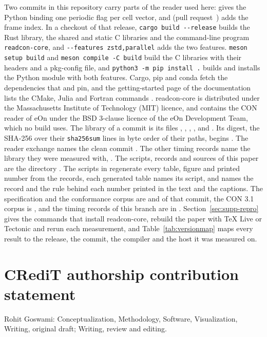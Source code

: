 \documentclass[preprint,12pt]{elsarticle}
\begin{document}
Two commits in this repository carry parts of the reader used here:
\texttt{\readconpbccommit} gives the Python binding one periodic flag
per cell vector, and \texttt{\readconrcidxcommit} (pull
request~\readconrcidxpr) adds the frame index.
In a checkout of that release, \texttt{cargo build -{}-release} builds
the Rust library, the shared and static C libraries and the command-line
program \texttt{readcon-core}, and \texttt{-{}-features zstd,parallel}
adds the two features.
\texttt{meson setup build} and \texttt{meson compile -C build} build the
C libraries with their headers and a pkg-config file, and
\texttt{python3 -m pip install .} builds and installs the Python module
with both features.
Cargo, pip and conda fetch the dependencies that  and
 pin, and the getting-started page of the
documentation lists the CMake, Julia and Fortran commands
\cite{readconDocsInstall}.
readcon-core is distributed under the Massachusetts Institute of
Technology (MIT) licence, and 
contains the CON reader of eOn under the BSD 3-clause licence of the eOn
Development Team, which no build uses.
The library of a commit is its files , ,
, ,  and
.
Its digest, the SHA-256 over their \texttt{sha256sum} lines in byte
order of their paths, begins \texttt{\readcondigest}.
The reader exchange names the clean commit \texttt{\rcHostCommit}.
The other timing records name the library they were measured with,
\texttt{\readconrecorddigest}.
The scripts, records and sources of this paper are the directory
.
The scripts in  regenerate every table, figure
and printed number from the records, each generated table names its
script, and  names the record and
the rule behind each number printed in the text and the captions.
The specification and the conformance corpus are
 and  of that
commit, the CON 3.1 corpus is , and the
timing records of this branch are in .
Section~\ref*{sec:supp-repro} gives the commands that install
readcon-core, rebuild the paper with TeX Live or Tectonic and rerun each
measurement, and Table~\ref*{tab:versionmap} maps every result to the
release, the commit, the compiler and the host it was measured on.

\FloatBarrier
\section*{CRediT authorship contribution statement}\label{sec:credit}
Rohit Goswami: Conceptualization, Methodology, Software, Visualization,
Writing, original draft; Writing, review and editing.
\end{document}
